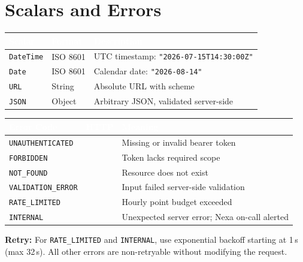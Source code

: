 \section*{Scalars and Errors}

\vspace{2pt}
\renewcommand{\arraystretch}{1.15}
{\footnotesize
\begin{tabularx}{\textwidth}{>{\RaggedRight\arraybackslash}p{}>{\RaggedRight\arraybackslash}p{}>{\RaggedRight\arraybackslash}X}
\toprule
\rowcolor{tablehead}
\textcolor{white}{\bfseries Scalar} & \textcolor{white}{\bfseries Format} & \textcolor{white}{\bfseries Description} \\
\midrule
\texttt{DateTime} & ISO 8601 & UTC timestamp: \texttt{"2026-07-15T14:30:00Z"}\\
\texttt{Date} & ISO 8601 & Calendar date: \texttt{"2026-08-14"}\\
\texttt{URL} & String & Absolute URL with scheme\\
\texttt{JSON} & Object & Arbitrary JSON, validated server-side\\
\bottomrule
\end{tabularx}
}

\vspace{8pt}
\renewcommand{\arraystretch}{1.15}
{\footnotesize
\begin{tabularx}{\textwidth}{>{\RaggedRight\arraybackslash}p{}>{\RaggedRight\arraybackslash}p{}>{\RaggedRight\arraybackslash}X}
\toprule
\rowcolor{tablehead}
\textcolor{white}{\bfseries Error Code} & \textcolor{white}{\bfseries HTTP} & \textcolor{white}{\bfseries Meaning} \\
\midrule
\texttt{UNAUTHENTICATED} & 401 & Missing or invalid bearer token\\
\texttt{FORBIDDEN} & 403 & Token lacks required scope\\
\texttt{NOT\_FOUND} & 404 & Resource does not exist\\
\texttt{VALIDATION\_ERROR} & 400 & Input failed server-side validation\\
\texttt{RATE\_LIMITED} & 429 & Hourly point budget exceeded\\
\texttt{INTERNAL} & 500 & Unexpected server error; Nexa on-call alerted\\
\bottomrule
\end{tabularx}
}

\vspace{8pt}
\begin{notebox}
{\small\textbf{Retry:} For \texttt{RATE\_LIMITED} and \texttt{INTERNAL}, use exponential backoff starting at 1\,s (max 32\,s). All other errors are non-retryable without modifying the request.}
\end{notebox}

\vfill
{}
